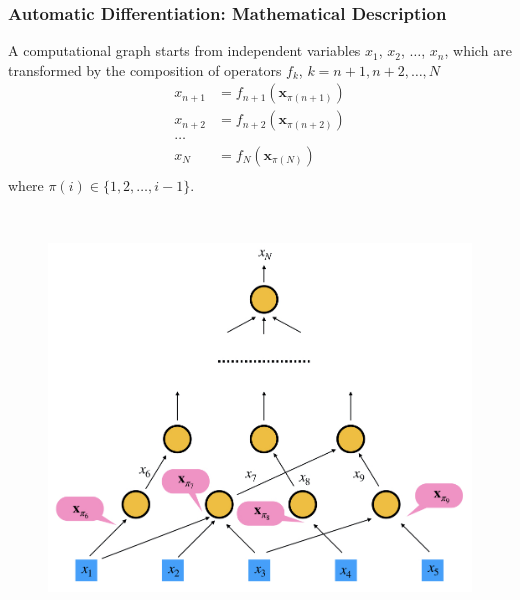 \documentclass{beamer}
\begin{document}
\begin{frame}
	\frametitle{Automatic Differentiation: Mathematical Description}
	\begin{minipage}[t]{0.49\textwidth}
	A computational graph starts from independent variables $x_1$, $x_2$, $\ldots$, $x_n$, which are transformed by the composition of operators $f_k$, $k = n+1, n+2, \ldots, N$
		$$\begin{aligned}
    x_{n+1} &= f_{n+1}(\mathbf{x}_{\pi({n+1})})\\
    x_{n+2} &= f_{n+2}(\mathbf{x}_{\pi({n+2})})\\
    \ldots\\
    x_{N} &= f_{N}(\mathbf{x}_{\pi({N})})\\
\end{aligned}$$
where $\pi(i) \in \{1,2,\ldots,i-1\}$. 
\end{minipage}~
\begin{minipage}[t]{0.49\textwidth}
  \begin{figure}[hbt]
  \includegraphics[width=1.0\textwidth]{../cg}
\end{figure}
\end{minipage}
\end{frame}
\end{document}
